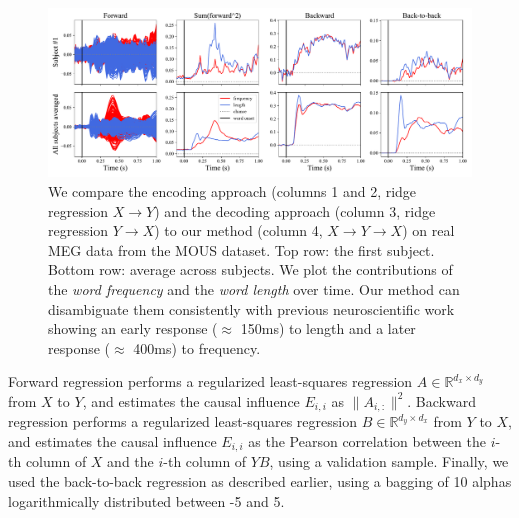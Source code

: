 \begin{figure}[t!]
  \centering
  \includegraphics[width=\textwidth, trim=0cm 0cm 0cm 0cm, clip=True]{figures/meg_twocurves.pdf}
  \caption{We compare the encoding approach (columns 1 and 2, ridge regression $X \rightarrow Y$) and the decoding approach (column 3, ridge regression $Y \rightarrow X$) to our method (column 4, $X \rightarrow Y \rightarrow X$) on real MEG data from the MOUS dataset. Top row: the first subject. Bottom row: average across subjects.
  We plot the contributions of the \textit{word frequency} and the \textit{word
  length} over time. Our method can disambiguate them consistently with
  previous neuroscientific work showing an early response ($\approx$ 150ms) to
  length and a later response ($\approx$ 400ms) to frequency.}
  \label{fig:meg_twocurves}
\end{figure}

Forward regression performs a regularized least-squares regression $A \in \mathbb{R}^{d_x \times d_y}$ from $X$ to $Y$, and estimates the causal influence $E_{i,i}$ as $\| A_{i, :} \|^2$.
%
Backward regression performs a regularized least-squares regression $B \in \mathbb{R}^{d_y \times d_x}$ from $Y$ to $X$, and estimates the causal influence $E_{i, i}$ as the Pearson correlation between the $i$-th column of $X$ and the $i$-th column of $YB$, using a validation sample.
%
Finally, we used the back-to-back regression as described earlier, using a bagging of 10 alphas logarithmically distributed between -5 and 5.

